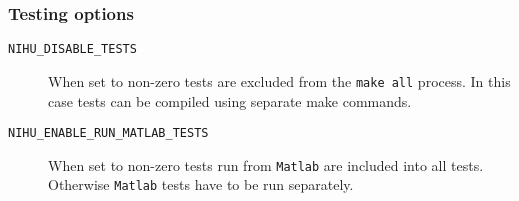 \documentclass[a4paper,10pt]{article}
\begin{document}
\subsubsection{Testing options}

\begin{description}
	\item [\texttt{NIHU\_DISABLE\_TESTS}] When set to non-zero tests are excluded from the \texttt{make all} process. In this case tests can be compiled using separate make commands.
	\item [\texttt{NIHU\_ENABLE\_RUN\_MATLAB\_TESTS}] When set to non-zero tests run from \texttt{Matlab} are included into all tests. Otherwise \texttt{Matlab} tests have to be run separately.
\end{description}
\end{document}
